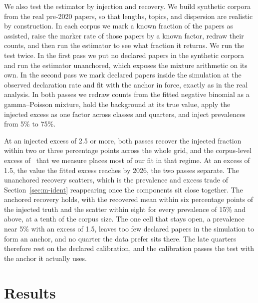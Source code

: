 \documentclass[twocolumn]{aastex631}
\begin{document}
We also test the estimator by injection and recovery. We build synthetic corpora from the real pre-2020 papers, so that lengths, topics, and dispersion are realistic by construction. In each corpus we mark a known fraction of the papers as assisted, raise the marker rate of those papers by a known factor, redraw their counts, and then run the estimator to see what fraction it returns. We run the test twice. In the first pass we put no declared papers in the synthetic corpora and run the estimator unanchored, which exposes the mixture arithmetic on its own. In the second pass we mark declared papers inside the simulation at the observed declaration rate and fit with the anchor in force, exactly as in the real analysis. In both passes we redraw counts from the fitted negative binomial as a gamma--Poisson mixture, hold the background at its true value, apply the injected excess as one factor across classes and quarters, and inject prevalences from 5\% to 75\%.

At an injected excess of 2.5 or more, both passes recover the injected fraction within two or three percentage points across the whole grid, and the corpus-level excess of \observedExcess\ that we measure places most of our fit in that regime. At an excess of 1.5, the value the fitted excess reaches by 2026, the two passes separate. The unanchored recovery scatters, which is the prevalence and excess trade of Section~\ref{sec:m-ident} reappearing once the components sit close together. The anchored recovery holds, with the recovered mean within six percentage points of the injected truth and the scatter within eight for every prevalence of 15\% and above, at a tenth of the corpus size. The one cell that stays open, a prevalence near 5\% with an excess of 1.5, leaves too few declared papers in the simulation to form an anchor, and no quarter the data prefer sits there. The late quarters therefore rest on the declared calibration, and the calibration passes the test with the anchor it actually uses.


\section{Results}\label{sec:results}
\end{document}

